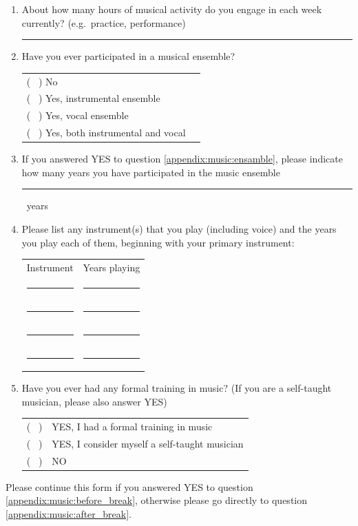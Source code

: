 \documentclass[a4paper,11pt]{article}
\newcommand{\myunderline}{\rule{2in}{.5pt}}
\begin{document}
{\begin{appendices}
\begin{enumerate}[resume]
	\item About how many hours of musical activity do you engage in each week currently? (e.g.\ practice, performance)

	\myunderline

	\item \label{appendix:music:ensamble}Have you ever participated in a musical ensemble?

	\begin{tabular}{l l}
		( \ ) No \\
		( \ ) Yes, instrumental ensemble \\
		( \ ) Yes, vocal ensemble \\
		( \ ) Yes, both instrumental and vocal \\
	\end{tabular}

	\item If you answered YES to question \ref{appendix:music:ensamble}, please indicate how many years you have participated in the music ensemble

	\myunderline \ years

	\item Please list any instrument(s) that you play (including voice) and the years you play each of them, beginning with your primary instrument:

	\begin{tabular}{c c}
		Instrument &  Years playing \\
		\myunderline & \myunderline \\
		\myunderline & \myunderline \\
		\myunderline & \myunderline \\
		\myunderline & \myunderline \\
	\end{tabular}

	\item \label{appendix:music:before_break}Have you ever had any formal training in music? (If you are a self-taught musician, please also answer YES)

	\begin{tabular}{l l}
		( \ ) & YES, I had a formal training in music \\
		( \ ) & YES, I consider myself a self-taught musician \\
		( \ ) & NO \\
	\end{tabular}

\end{enumerate}
Please continue this form if you answered YES to question \ref{appendix:music:before_break}, otherwise please go directly to question \ref{appendix:music:after_break}.
\begin{enumerate}[resume]


\end{enumerate}
\end{appendices}}
\end{document}
